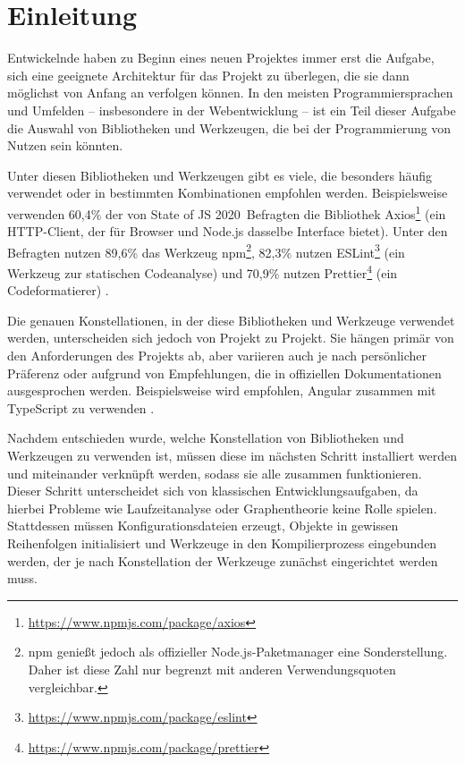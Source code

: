 \section{Einleitung}
Entwickelnde haben zu Beginn eines neuen Projektes immer erst die Aufgabe, sich eine geeignete Architektur für das Projekt zu überlegen, die sie dann möglichst von Anfang an verfolgen können. In den meisten Programmiersprachen und Umfelden -- insbesondere in der Webentwicklung -- ist ein Teil dieser Aufgabe die Auswahl von Bibliotheken und Werkzeugen, die bei der Programmierung von Nutzen sein könnten.

Unter diesen Bibliotheken und Werkzeugen gibt es viele, die besonders häufig verwendet oder in bestimmten Kombinationen empfohlen werden. Beispielsweise verwenden 60,4\% der von \glqq State of JS 2020\grqq\ Befragten die Bibliothek Axios\footnote{\url{https://www.npmjs.com/package/axios}} (ein HTTP-Client, der für Browser und Node.js dasselbe Interface bietet). Unter den Befragten nutzen 89,6\% das Werkzeug \gls{npm}\footnote{\gls{npm} genießt jedoch als offizieller Node.js-Paketmanager eine Sonderstellung. Daher ist diese Zahl nur begrenzt mit anderen Verwendungsquoten vergleichbar.}, 82,3\% nutzen ESLint\footnote{\url{https://www.npmjs.com/package/eslint}} (ein Werkzeug zur statischen Codeanalyse) und 70,9\% nutzen Prettier\footnote{\url{https://www.npmjs.com/package/prettier}} (ein Codeformatierer) \cite{stateofjs}.

Die genauen Konstellationen, in der diese Bibliotheken und Werkzeuge verwendet werden, unterscheiden sich jedoch von Projekt zu Projekt. Sie hängen primär von den Anforderungen des Projekts ab, aber variieren auch je nach persönlicher Präferenz oder aufgrund von Empfehlungen, die in offiziellen Dokumentationen ausgesprochen werden. Beispielsweise wird empfohlen, Angular zusammen mit TypeScript zu verwenden \cite{angular_only_with_typescript}.

Nachdem entschieden wurde, welche Konstellation von Bibliotheken und Werkzeugen zu verwenden ist, müssen diese im nächsten Schritt installiert werden und miteinander verknüpft werden, sodass sie alle zusammen funktionieren. Dieser Schritt unterscheidet sich von klassischen Entwicklungsaufgaben, da hierbei Probleme wie Laufzeitanalyse oder Graphentheorie keine Rolle spielen. Stattdessen müssen Konfigurationsdateien erzeugt, Objekte in gewissen Reihenfolgen initialisiert und Werkzeuge in den Kompilierprozess eingebunden werden, der je nach Konstellation der Werkzeuge zunächst eingerichtet werden muss.

